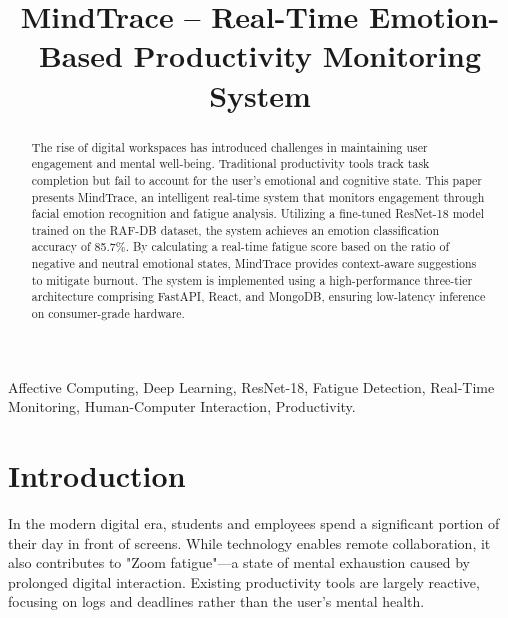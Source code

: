 \documentclass[conference]{IEEEtran}
\begin{document}
\title{\fontsize{20}{24}\selectfont\bfseries MindTrace – Real-Time Emotion-Based Productivity Monitoring System}

\author{
\vspace{0.5em}
}

\maketitle

\begin{abstract}
The rise of digital workspaces has introduced challenges in maintaining user engagement and mental well-being. Traditional productivity tools track task completion but fail to account for the user's emotional and cognitive state. This paper presents MindTrace, an intelligent real-time system that monitors engagement through facial emotion recognition and fatigue analysis. Utilizing a fine-tuned ResNet-18 model trained on the RAF-DB dataset, the system achieves an emotion classification accuracy of 85.7\%. By calculating a real-time fatigue score based on the ratio of negative and neutral emotional states, MindTrace provides context-aware suggestions to mitigate burnout. The system is implemented using a high-performance three-tier architecture comprising FastAPI, React, and MongoDB, ensuring low-latency inference on consumer-grade hardware.
\end{abstract}

\begin{IEEEkeywords}
Affective Computing, Deep Learning, ResNet-18, Fatigue Detection, Real-Time Monitoring, Human-Computer Interaction, Productivity.
\end{IEEEkeywords}

\section{Introduction}
In the modern digital era, students and employees spend a significant portion of their day in front of screens. While technology enables remote collaboration, it also contributes to "Zoom fatigue"—a state of mental exhaustion caused by prolonged digital interaction. Existing productivity tools are largely reactive, focusing on logs and deadlines rather than the user's mental health.
\end{document}
